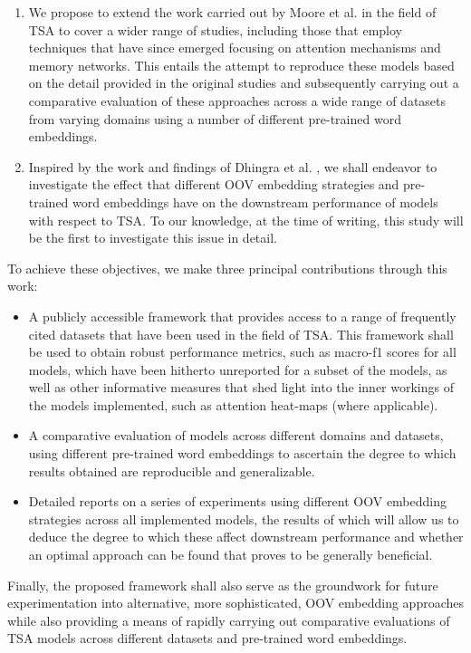 \documentclass[../../fyp.tex]{subfiles}
\begin{document}
\begin{enumerate}
	\item We propose to extend the work carried out by Moore et al. \cite{moore2018} in the field of TSA to cover a wider range of studies, including those that employ techniques that have since emerged focusing on attention mechanisms and memory networks. This entails the attempt to reproduce these models based on the detail provided in the original studies and subsequently carrying out a comparative evaluation of these approaches across a wide range of datasets from varying domains using a number of different pre-trained word embeddings.
	\item Inspired by the work and findings of Dhingra et al. \cite{bhuwandhingra2017}, we shall endeavor to investigate the effect that different OOV embedding strategies and pre-trained word embeddings have on the downstream performance of models with respect to TSA. To our knowledge, at the time of writing, this study will be the first to investigate this issue in detail.
\end{enumerate}

To achieve these objectives, we make three principal contributions through this work:
\begin{itemize}
	\item A publicly accessible framework that provides access to a range of frequently cited datasets that have been used in the field of TSA. This framework shall be used to obtain robust performance metrics, such as macro-f1 scores for all models, which have been hitherto unreported for a subset of the models, as well as other informative measures that shed light into the inner workings of the models implemented, such as attention heat-maps (where applicable).
	\item A comparative evaluation of models across different domains and datasets, using different pre-trained word embeddings to ascertain the degree to which results obtained are reproducible and generalizable.
	\item Detailed reports on a series of experiments using different OOV embedding strategies across all implemented models, the results of which will allow us to deduce the degree to which these affect downstream performance and whether an optimal approach can be found that proves to be generally beneficial.
\end{itemize}

Finally, the proposed framework shall also serve as the groundwork for future experimentation into alternative, more sophisticated, OOV embedding approaches while also providing a means of rapidly carrying out comparative evaluations of TSA models across different datasets and pre-trained word embeddings.
\end{document}
